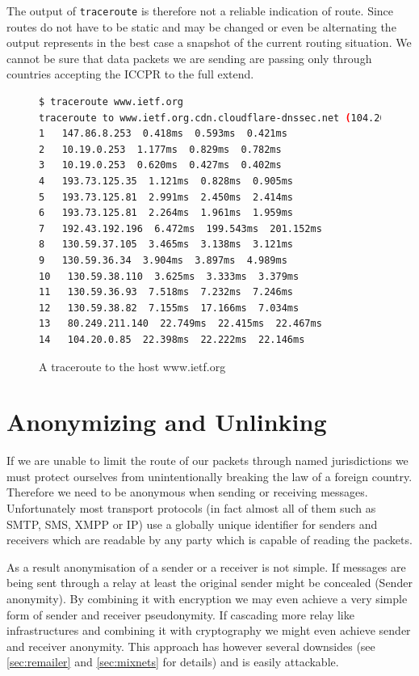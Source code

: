 The output of \verb|traceroute| is therefore not a reliable indication of route. Since routes do not have to be static and may be changed or even be alternating the output represents in the best case a snapshot of the current routing situation. We cannot be sure that data packets we are sending are passing only through countries accepting the ICCPR to the full extend.
\begin{figure}[H]
	\begin{lstlisting}[language=bash,breaklines=true,prebreak={\mbox{\quad$\rhookswarrow$}},basicstyle=\tiny]
$ traceroute www.ietf.org
traceroute to www.ietf.org.cdn.cloudflare-dnssec.net (104.20.0.85), 64 hops max
1   147.86.8.253  0.418ms  0.593ms  0.421ms
2   10.19.0.253  1.177ms  0.829ms  0.782ms
3   10.19.0.253  0.620ms  0.427ms  0.402ms
4   193.73.125.35  1.121ms  0.828ms  0.905ms
5   193.73.125.81  2.991ms  2.450ms  2.414ms
6   193.73.125.81  2.264ms  1.961ms  1.959ms
7   192.43.192.196  6.472ms  199.543ms  201.152ms
8   130.59.37.105  3.465ms  3.138ms  3.121ms
9   130.59.36.34  3.904ms  3.897ms  4.989ms
10   130.59.38.110  3.625ms  3.333ms  3.379ms
11   130.59.36.93  7.518ms  7.232ms  7.246ms
12   130.59.38.82  7.155ms  17.166ms  7.034ms
13   80.249.211.140  22.749ms  22.415ms  22.467ms
14   104.20.0.85  22.398ms  22.222ms  22.146ms
	\end{lstlisting}
	\caption{A traceroute to the host www.ietf.org}
\end{figure}

\section{Anonymizing and Unlinking}
If we are unable to limit the route of our packets through named jurisdictions we must protect ourselves from unintentionally breaking the law of a foreign country. Therefore we need to be anonymous when sending or receiving messages. Unfortunately most transport protocols (in fact almost all of them such as SMTP, SMS, XMPP or IP) use a globally unique identifier for senders and receivers which are readable by any party which is capable of reading the packets. 

As a result anonymisation of a sender or a receiver is not simple. If messages are being sent through a relay at least the original sender might be concealed (Sender anonymity). By combining it with encryption we may even achieve a very simple form of sender and receiver pseudonymity. If cascading more relay like infrastructures and combining it with cryptography we might even achieve sender and receiver anonymity. This approach has however several downsides (see \ref{sec:remailer} and \ref{sec:mixnets} for details) and is easily attackable.

